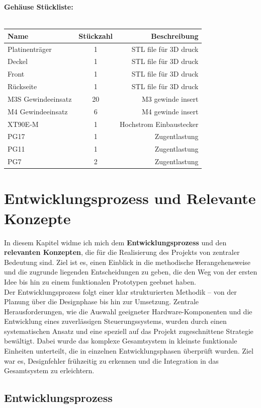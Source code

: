 \documentclass[paper=a4,11pt]{scrreprt}
\begin{document}
\textbf{Gehäuse Stückliste:}\\
\\
\begin{tabular}[h]{l|c|r}
\label{GeStk}
\textbf{Name} & \textbf{Stückzahl} & \textbf{Beschreibung} \\
\hline
Platinenträger & 1 & STL file für 3D druck \\
\hline
Deckel & 1 & STL file für 3D druck \\
\hline
Front & 1 & STL file für 3D druck \\
\hline
Rückseite & 1 & STL file für 3D druck \\
\hline
M3S Gewindeeinsatz & 20 & M3 gewinde insert \\
\hline
M4 Gewindeeinsatz & 6 & M4 gewinde insert \\
\hline
XT90E-M & 1 & Hochstrom Einbaustecker \\
\hline
PG17 & 1 & Zugentlastung \\
\hline
PG11 & 1 & Zugentlastung \\
\hline
PG7 & 2 & Zugentlastung \\
\end{tabular}



\part{Entwicklungsprozess und Relevante Konzepte}
In diesem Kapitel widme ich mich dem \textbf{Entwicklungsprozess} und den \textbf{relevanten Konzepten}, die für die Realisierung des Projekts von zentraler Bedeutung sind. Ziel ist es, einen Einblick in die methodische Herangehensweise und die zugrunde liegenden Entscheidungen zu geben, die den Weg von der ersten Idee bis hin zu einem funktionalen Prototypen geebnet haben.\\
Der Entwicklungsprozess folgt einer klar strukturierten Methodik – von der Planung über die Designphase bis hin zur Umsetzung. Zentrale Herausforderungen, wie die Auswahl geeigneter Hardware-Komponenten und die Entwicklung eines zuverlässigen Steuerungssystems, wurden durch einen systematischen Ansatz und eine speziell auf das Projekt zugeschnittene Strategie bewältigt. Dabei wurde das komplexe Gesamtsystem in kleinste funktionale Einheiten unterteilt, die in einzelnen Entwicklungsphasen überprüft wurden. Ziel war es, Designfehler frühzeitig zu erkennen und die Integration in das Gesamtsystem zu erleichtern.
\chapter{Entwicklungsprozess}
\end{document}
